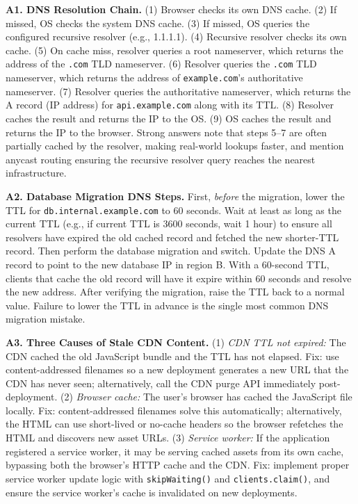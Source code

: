 \documentclass[11pt,a4paper]{article}
\begin{document}
\newpage
\begin{answerbox}
\textbf{A1. DNS Resolution Chain.}
(1) Browser checks its own DNS cache. (2) If missed, OS checks the system DNS cache. (3) If missed, OS queries the configured recursive resolver (e.g., 1.1.1.1). (4) Recursive resolver checks its own cache. (5) On cache miss, resolver queries a root nameserver, which returns the address of the \texttt{.com} TLD nameserver. (6) Resolver queries the \texttt{.com} TLD nameserver, which returns the address of \texttt{example.com}'s authoritative nameserver. (7) Resolver queries the authoritative nameserver, which returns the A record (IP address) for \texttt{api.example.com} along with its TTL. (8) Resolver caches the result and returns the IP to the OS. (9) OS caches the result and returns the IP to the browser. Strong answers note that steps 5--7 are often partially cached by the resolver, making real-world lookups faster, and mention anycast routing ensuring the recursive resolver query reaches the nearest infrastructure.

\medskip
\textbf{A2. Database Migration DNS Steps.}
First, \textit{before} the migration, lower the TTL for \texttt{db.internal.example.com} to 60 seconds. Wait at least as long as the current TTL (e.g., if current TTL is 3600 seconds, wait 1 hour) to ensure all resolvers have expired the old cached record and fetched the new shorter-TTL record. Then perform the database migration and switch. Update the DNS A record to point to the new database IP in region B. With a 60-second TTL, clients that cache the old record will have it expire within 60 seconds and resolve the new address. After verifying the migration, raise the TTL back to a normal value. Failure to lower the TTL in advance is the single most common DNS migration mistake.

\medskip
\textbf{A3. Three Causes of Stale CDN Content.}
(1) \textit{CDN TTL not expired:} The CDN cached the old JavaScript bundle and the TTL has not elapsed. Fix: use content-addressed filenames so a new deployment generates a new URL that the CDN has never seen; alternatively, call the CDN purge API immediately post-deployment. (2) \textit{Browser cache:} The user's browser has cached the JavaScript file locally. Fix: content-addressed filenames solve this automatically; alternatively, the HTML can use short-lived or no-cache headers so the browser refetches the HTML and discovers new asset URLs. (3) \textit{Service worker:} If the application registered a service worker, it may be serving cached assets from its own cache, bypassing both the browser's HTTP cache and the CDN. Fix: implement proper service worker update logic with \texttt{skipWaiting()} and \texttt{clients.claim()}, and ensure the service worker's cache is invalidated on new deployments.


\end{answerbox}
\end{document}
